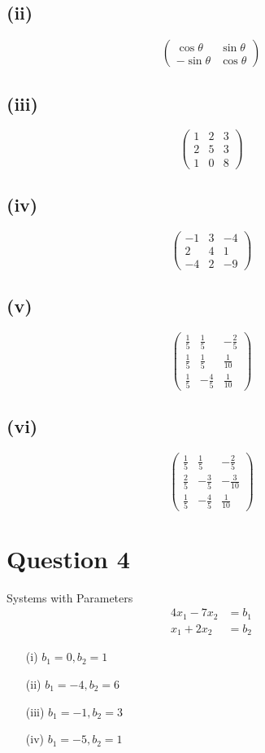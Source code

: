 \documentclass[12pt]{article}
\begin{document}
\subsection*{(ii)}
\[
\begin{pmatrix}
\cos\theta & \sin\theta\\
-\sin\theta & \cos\theta
\end{pmatrix}
\]

\subsection*{(iii)}
\[
\begin{pmatrix}
1 & 2 & 3\\
2 & 5 & 3\\
1 & 0 & 8
\end{pmatrix}
\]

\subsection*{(iv)}
\[
\begin{pmatrix}
-1 & 3 & -4\\
2 & 4 & 1\\
-4 & 2 & -9
\end{pmatrix}
\]

\subsection*{(v)}
\[
\begin{pmatrix}
\frac{1}{5} & \frac{1}{5} & -\frac{2}{5}\\
\frac{1}{5} & \frac{1}{5} & \frac{1}{10}\\
\frac{1}{5} & -\frac{4}{5} & \frac{1}{10}
\end{pmatrix}
\]

\subsection*{(vi)}
\[
\begin{pmatrix}
\frac{1}{5} & \frac{1}{5} & -\frac{2}{5}\\
\frac{2}{5} & -\frac{3}{5} & -\frac{3}{10}\\
\frac{1}{5} & -\frac{4}{5} & \frac{1}{10}
\end{pmatrix}
\]

\section*{Question 4}
Systems with Parameters
\[
\begin{aligned}
4x_1 - 7x_2 &= b_1\\
x_1 + 2x_2 &= b_2
\end{aligned}
\]

\begin{itemize}
\item[(i)] $b_1 = 0, b_2 = 1$
\item[(ii)] $b_1 = -4, b_2 = 6$
\item[(iii)] $b_1 = -1, b_2 = 3$
\item[(iv)] $b_1 = -5, b_2 = 1$
\end{itemize}
\end{document}
